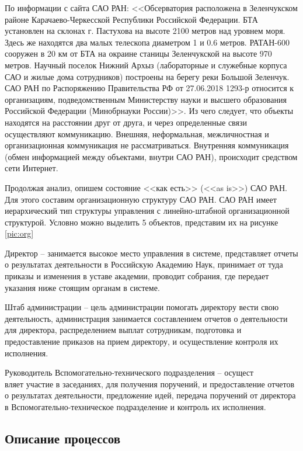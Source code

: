 По информации с сайта САО РАН: <<Обсерватория расположена в Зеленчукском районе Карачаево-Черкесской Республики Российской Федерации. БТА установлен на склонах г. Пастухова на высоте 2100 метров над уровнем моря. Здесь же находятся два малых телескопа диаметром 1 и 0.6 метров. РАТАН-600 сооружен в 20 км от БТА на окраине станицы Зеленчукской на высоте 970 метров. Научный поселок Нижний Архыз (лабораторные и служебные корпуса САО и жилые дома сотрудников) построены на берегу реки Большой Зеленчук. САО РАН по Распоряжению Правительства РФ от 27.06.2018 1293-р относится к организациям, подведомственным Министерству науки и высшего образования Российской Федерации (Минобрнауки России)>>\cite{Korn}. Из чего следует, что объекты находятся на расстоянии друг от друга, и через определенные связи осуществляют коммуникацию. Внешняя, неформальная, межличностная и организационная коммуникация не рассматриваться. Внутренняя коммуникация (обмен информацией между объектами, внутри САО РАН), происходит средством сети Интернет. 

 

Продолжая анализ, опишем состояние <<как есть>> (<<as is>>) САО РАН. Для этого составим организационную структуру САО РАН. САО РАН имеет иерархический тип структуры управления с линейно-штабной организационной структурой. Условно можно выделить 5 объектов, представим их  на рисунке \ref{pic:org}

Директор -- занимается высокое место управления в системе, представляет отчеты о результатах деятельности в Российскую Академию Наук, принимает от туда приказы и изменения в уставе академии, проводит собрания, где передает указания ниже стоящим органам в системе.
  
Штаб администрации -- цель администрации помогать директору вести свою деятельность, администрация занимается составлением отчетов о деятельности для директора, распределением выплат сотрудникам, подготовка и предоставление приказов на прием директору, и осуществление контроля их исполнения.

Руководитель Вспомогательно-технического подразделения -- осущест\\вляет участие в заседаниях, для получения поручений, и предоставление отчетов о результатах деятельности, предложение идей, передача поручений от директора в Вспомогательно-техническое подразделение и контроль их исполнения. 


\subsection{Описание процессов}

